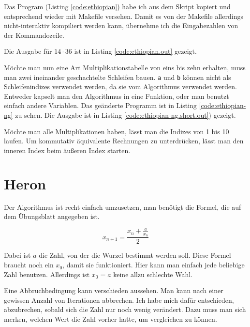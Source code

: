 Das Program (Listing \ref{code:ethiopian}) habe ich aus dem Skript kopiert und entsprechend wieder mit Makefile versehen. Damit es von der Makefile allerdings nicht-interaktiv kompiliert werden kann, übernehme ich die Eingabezahlen von der Kommandozeile.


Die Ausgabe für $14 \cdot 36$ ist in Listing \ref{code:ethiopian.out} gezeigt.


Möchte man nun eine Art Multiplikationstabelle von eins bis zehn erhalten, muss man zwei ineinander geschachtelte Schleifen bauen. \texttt{a} und \texttt{b} können nicht als Schleifenindizes verwendet werden, da sie vom Algorithmus verwendet werden. Entweder kapselt man den Algorithmus in eine Funktion, oder man benutzt einfach andere Variablen. Das geänderte Programm ist in Listing \ref{code:ethiopian-ng} zu sehen. Die Ausgabe ist in Listing \ref{code:ethiopian-ng.short.out}) gezeigt.



Möchte man alle Multiplikationen haben, lässt man die Indizes von 1 bis 10 laufen. Um kommutativ äquivalente Rechnungen zu unterdrücken, lässt man den inneren Index beim äußeren Index starten.

\section{Heron}

Der Algorithmus ist recht einfach umzusetzen, man benötigt die Formel, die auf dem Übungsblatt angegeben ist.

\begin{equation}
x_{n+1}=\frac{x_n+\frac{a}{x_n}}{2}
\end{equation}

Dabei ist $a$ die Zahl, von der die Wurzel bestimmt werden soll. Diese Formel braucht noch ein $x_0$, damit sie funktioniert. Hier kann man einfach jede beliebige Zahl benutzen. Allerdings ist $x_0=a$ keine allzu schlechte Wahl.

Eine Abbruchbedingung kann verschieden aussehen. Man kann nach einer gewissen Anzahl von Iterationen abbrechen. Ich habe mich dafür entschieden, abzubrechen, sobald sich die Zahl nur noch wenig verändert. Dazu muss man sich merken, welchen Wert die Zahl vorher hatte, um vergleichen zu können.


